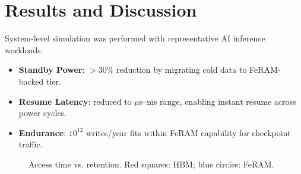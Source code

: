 \section{Results and Discussion}
System-level simulation was performed with representative AI inference workloads.

\begin{itemize}
  \item \textbf{Standby Power}: $>$30\% reduction by migrating cold data to FeRAM-backed tier.
  \item \textbf{Resume Latency}: reduced to $\mu$s–ms range, enabling instant resume across power cycles.
  \item \textbf{Endurance}: $10^{12}$ writes/year fits within FeRAM capability for checkpoint traffic.
\end{itemize}

\begin{figure}[!t]
\centering
{}
\caption{Access time vs. retention. Red squares: HBM; blue circles: FeRAM.}
\label{fig:retention}
\end{figure}
